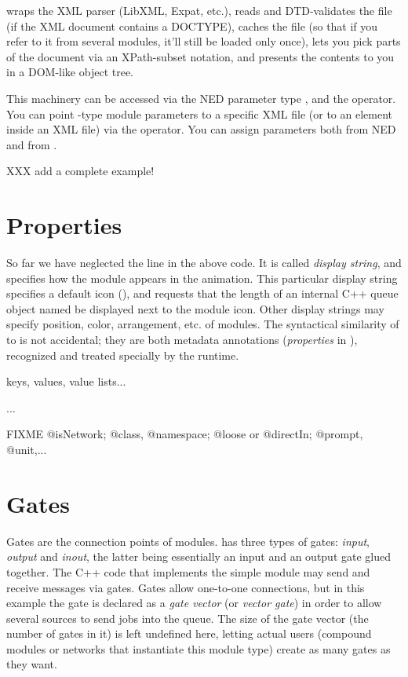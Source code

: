 {\opp} wraps the XML parser (LibXML, Expat, etc.), reads and DTD-validates
the file (if the XML document contains a DOCTYPE), caches the file
(so that if you refer to it from several modules, it'll still be loaded
only once), lets you pick parts of the document via an XPath-subset notation,
and presents the contents to you in a DOM-like object tree.

This machinery can be accessed via the NED parameter type , and the
 operator. You can point -type module parameters
to a specific XML file (or to an element inside an XML file) via the
 operator. You can assign  parameters both from NED
and from .

XXX add a complete example!


\section{Properties}

So far we have neglected the  line in the above code. It is called
\textit{display string}, and specifies how the module appears in the animation.
This particular display string specifies a default icon
(), and requests that the length of an internal C++ queue
object named  be displayed next to the module icon. Other display
strings may specify position, color, arrangement, etc. of modules. The
syntactical similarity of  to  is not accidental; they
are both metadata annotations (\textit{properties} in \opp), recognized and
treated specially by the runtime.

keys, values, value lists...

...

FIXME @isNetwork; @class, @namespace; @loose or @directIn; @prompt, @unit,...


\section{Gates}


Gates are the connection points of modules. \opp has three types of gates:
\textit{input}, \textit{output} and \textit{inout}, the latter being essentially
an input and an output gate glued together. The C++ code that implements the
simple module may send and receive messages via gates. Gates allow one-to-one
connections, but in this example the  gate is declared as a \textit{gate
vector} (or \textit{vector gate}) in order to allow several sources to send jobs
into the queue. The size of the gate vector (the number of gates in it) is left
undefined here, letting actual users (compound modules or networks that
instantiate this module type) create as many gates as they want.

